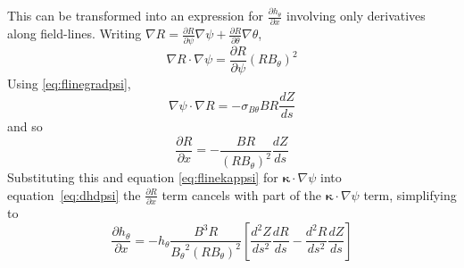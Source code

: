 \documentclass[12pt, a4paper]{article}
\newcommand{\deriv}[2]{\ensuremath{\frac{\partial #1}{\partial #2}}}
\newcommand{\hthe}{\ensuremath{h_\theta}}
\newcommand{\Bp}{\ensuremath{B_\theta}}
\newcommand{\Vec}[1]{\ensuremath{\mathbf{#1}}}
\newcommand{\kvec}{\Vec{\kappa}}
\newcommand{\rbp}{\ensuremath{R\Bp}}
\newcommand{\rbpsq}{\ensuremath{\left(\rbp\right)^2}}
\newcommand{\sbp}{\ensuremath{\sigma_{B\theta}}}
\begin{document}
This can be transformed into an expression for $\deriv{\hthe}{x}$ involving only derivatives along
field-lines. 
Writing $\nabla R = \deriv{R}{\psi}\nabla\psi + \deriv{R}{\theta}\nabla\theta$, 
\[
\nabla R \cdot \nabla\psi = \deriv{R}{\psi}\rbpsq
\]
Using \ref{eq:flinegradpsi}, 
\[
\nabla\psi \cdot \nabla R = -\sbp B R\frac{dZ}{ds}
\]
and so
\[
\deriv{R}{x} = -\frac{BR}{\rbpsq}\frac{dZ}{ds}
\]
Substituting this and equation \ref{eq:flinekappsi} for $\kvec\cdot\nabla\psi$ into equation~\ref{eq:dhdpsi}
the $\deriv{R}{x}$ term cancels with part of the $\kvec\cdot\nabla\psi$ term, simplifying to
\begin{equation}
\deriv{\hthe}{x} = -\hthe\frac{B^3R}{\Bp^2\rbpsq}\left[\frac{d^2Z}{ds^2}\frac{dR}{ds} - \frac{d^2R}{ds^2}\frac{dZ}{ds}\right]
\end{equation}
\end{document}
